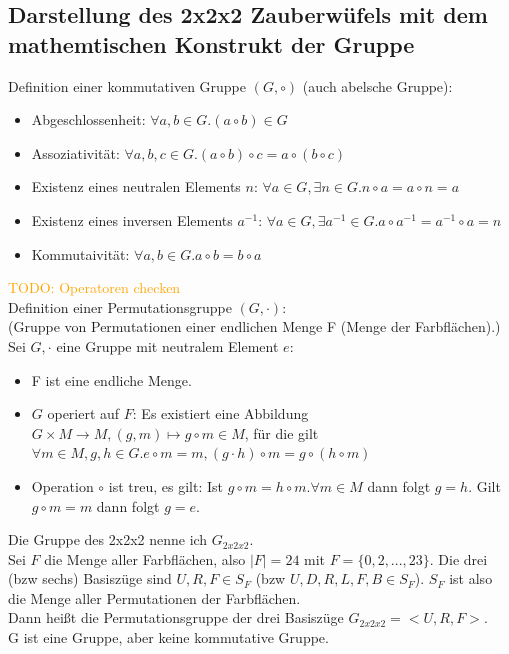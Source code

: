 \documentclass[12pt,a4paper, usenames, dvipsnames]{scrartcl}
\begin{document}
\subsection*{Darstellung des 2x2x2 Zauberwüfels mit dem mathemtischen Konstrukt der Gruppe}
Definition einer kommutativen Gruppe $(G, \circ)$ (auch abelsche Gruppe):
\begin{itemize}
\item Abgeschlossenheit: $\forall a,b \in G.(a \circ b) \in G $
\item Assoziativität: $\forall a,b,c \in G.(a \circ b) \circ c = a \circ (b \circ c)$
\item Existenz eines neutralen Elements $n$: $\forall a \in G, \exists n \in G.n \circ a = a \circ n = a$ 
\item Existenz eines inversen Elements $a^{-1}$: $\forall a \in G, \exists a^{-1} \in G. a \circ a^{-1} = a^{-1} \circ a = n$ 
\item Kommutaivität: $\forall a,b \in G.a \circ b = b \circ a$
\end{itemize}
\textcolor{orange}{TODO: Operatoren checken} \\
Definition einer Permutationsgruppe $(G, \cdot)$: \\
(Gruppe von Permutationen einer endlichen Menge F (Menge der Farbflächen).)\\
Sei $G, \cdot$ eine Gruppe mit neutralem Element $e$:
\begin{itemize}
\item F ist eine endliche Menge.
\item $G$ operiert auf $F$: Es existiert eine Abbildung $G \times M \rightarrow M, (g,m) \mapsto g \circ m \in M$, für die gilt $\forall m \in M, g,h \in G.e \circ m =m, (g \cdot h) \circ m = g \circ (h \circ m)$
\item Operation $\circ$ ist treu, es gilt: Ist $g \circ m = h \circ m.\forall m \in M$ dann folgt $g=h$. Gilt $g \circ m = m$ dann folgt $g = e$.
\end{itemize}
Die Gruppe des 2x2x2 nenne ich $G_{2x2x2}$. \\
Sei $F$ die Menge aller Farbflächen, also $|F|=24$ mit $F = \lbrace 0, 2, ..., 23\rbrace$.
Die drei (bzw sechs) Basiszüge sind $U, R, F \in S_F$ (bzw $U, D, R, L, F, B \in S_F$). $S_F$ ist also die Menge aller Permutationen der Farbflächen. \\
Dann heißt die Permutationsgruppe der drei Basiszüge $G_{2x2x2}=<U, R, F>$. \\
G ist eine Gruppe, aber keine kommutative Gruppe. \color{orange}{(?)} \color{black}\\
\end{document}
